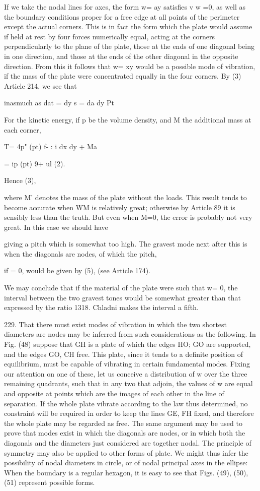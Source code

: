 If we take the nodal lines for axes, the form w= ay satisfies v w =0, as
well as the boundary conditions proper for a free edge at all points of
the perimeter except the actual corners. This is in fact the form which
the plate would assume if held at rest by four forces numerically equal,
acting at the corners perpendicularly to the plane of the plate, those
at the ends of one diagonal being in one direction, and those at the
ends of the other diagonal in the opposite direction. From this it
follows that w= xy would be a possible mode of vibration, if the
mass of the plate were concentrated equally in the four corners. By (3)
Article 214, we see that

inasmuch as dat = dy s = da dy Pt

For the kinetic energy, if p be the volume density, and M the additional
mass at each corner,

T= 4p" (pt) f- : i dx dy + Ma

= ip (pt) 9+ ul (2).

Hence (3),

where M' denotes the mass of the plate without the loads. This result
tends to become accurate when WM is relatively great; otherwise by
Article 89 it is sensibly less than the truth. But even when M=0, the
error is probably not very great. In this case we should have

giving a pitch which is somewhat too high. The gravest mode next after
this is when the diagonals are nodes, of which the pitch,

if = 0, would be given by (5), (see Article 174).

We may conclude that if the material of the plate were such that w= 0,
the interval between the two gravest tones would be somewhat greater
than that expressed by the ratio 1318. Chladni makes the interval a
fifth.

229. That there must exist modes of vibration in which the two shortest
diameters are nodes may be inferred from such considerations as the
following. In Fig. (48) suppose that GH
is a plate of which the edges HO; GO are supported, and the edges GO, CH
free. This plate, since it tends to a definite position of equilibrium,
must be capable of vibrating in certain fundamental modes. Fixing our
attention on one of these, let us conceive a distribution of w over the
three remaining quadrants, such that in any two that adjoin, the values
of w are equal and opposite at points which are the images of each other
in the line of separation. If the whole plate vibrate according to the
law thus determined, no constraint will be required in order to keep the
lines GE, FH fixed, and therefore the whole plate may be regarded as
free. The same argument may be used to prove that modes exist in which
the diagonals are nodes, or in which both the diagonals and the
diameters just considered are together nodal. The principle of symmetry
may also be applied to other forms of plate. We might thus infer the
possibility of nodal diameters in circle, or of nodal principal axes in
the ellipse: When the
boundary is a regular hexagon, it is easy to see that Figs. (49), (50),
(51) represent possible forms.

